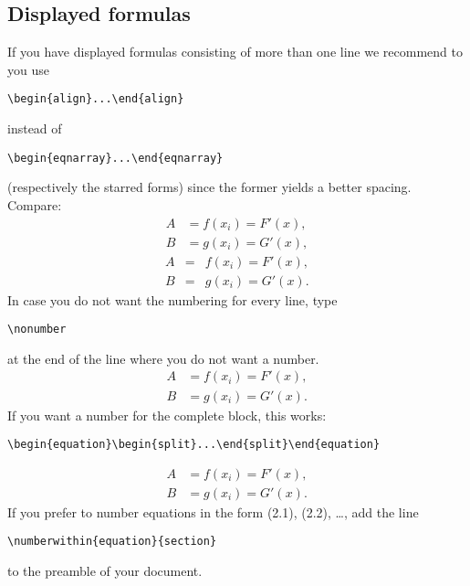 \documentclass{RSMUP}
\theoremstyle{definition}
\begin{document}
\subsection{Displayed formulas} If you have displayed formulas consisting of more than one line
we recommend to you use
\begin{verbatim}\begin{align}...\end{align}\end{verbatim}
 instead of
\begin{verbatim}\begin{eqnarray}...\end{eqnarray}\end{verbatim}
(respectively the  starred forms) since the former yields a better spacing. Compare:
\begin{align}
A&=  f(x_i)= F'(x),
\\
B&=  g(x_i)= G'(x),
\end{align}
\begin{eqnarray}
A&=& f(x_i)= F'(x),
\\
B&=& g(x_i)= G'(x).
\end{eqnarray}
In case you do not want the numbering for every line, type
\begin{verbatim}\nonumber\end{verbatim}
at the end of the line where you do not want a number.
\begin{align}
A&=  f(x_i)= F'(x),\nonumber
\\
B&=  g(x_i)= G'(x).
\end{align}
If you want a number for the complete block, this works:
\begin{verbatim}
\begin{equation}\begin{split}...\end{split}\end{equation}
\end{verbatim}
\begin{equation}
\begin{split}
A&=  f(x_i)= F'(x),
\\
B&=  g(x_i)= G'(x).
\end{split}
\end{equation}
If you prefer to number equations in the form (2.1), (2.2), \dots, add the line
\begin{verbatim}
\numberwithin{equation}{section}
\end{verbatim}
to the preamble of your document.
\end{document}
